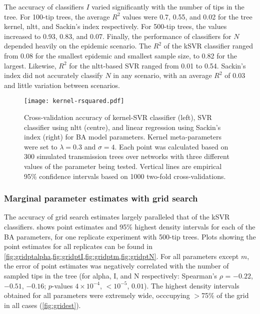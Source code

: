The accuracy of classifiers $I$ varied significantly with the number of tips in
the tree. For 100-tip trees, the average $R^2$ values were
  0.7,
  0.55, and
  0.02
for the tree kernel, \gls{nltt}, and Sackin's index respectively. For 500-tip
trees, the values increased to
  0.93,
  0.83, and
  0.07.
Finally, the performance of classifiers for $N$ depended heavily on the
epidemic scenario. The $R^2$ of the \gls{kSVR} classifier ranged from
  0.08
for the smallest epidemic and smallest sample size, to
  0.82
for the largest. Likewise, $R^2$ for the \gls{nltt}-based SVR ranged from 
  0.01
to
  0.54.
Sackin's index did not accurately classify $N$ in any scenario, with an average
$R^2$ of
  0.03
and little variation between scenarios.

\begin{figure}[ht]
  \centering
  \texttt{[image: kernel-rsquared.pdf]}
  \caption[Cross-validation accuracy of kernel-SVR, nLTT-based SVR, and
  Sackin's index regression classifiers for BA model parameters.]{
      Cross-validation accuracy of kernel-SVR classifier (left), SVR classifier
      using \gls{nltt} (centre), and linear regression using Sackin's index
      (right) for \gls{BA} model parameters. Kernel meta-parameters were set to
      $\lambda = 0.3$ and $\sigma = 4$. Each point was calculated based on 300
      simulated transmission trees over networks with three different values of
      the parameter being tested. Vertical lines are empirical 95\% confidence
      intervals based on 1000 two-fold cross-validations.
  }
  \label{fig:rsquared}
\end{figure}

\subsubsection*{Marginal parameter estimates with grid search}



The accuracy of grid search estimates largely paralleled that of the \gls{kSVR}
classifiers.  shows point estimates and 95\% highest density
intervals for each of the \gls{BA} parameters, for one replicate experiment
with 500-tip trees. Plots showing the point estimates for all replicates can be
found in \cref{fig:gridptalpha,fig:gridptI,fig:gridptm,fig:gridptN}. For all
parameters except $m$, the error of point estimates was negatively correlated
with the number of sampled tips in the tree (for
\gls{alpha}, \gls{I}, and \gls{N} respectively: Spearman's $\rho$ = 
    \ensuremath{-0.22},
    \ensuremath{-0.51},
    \ensuremath{-0.16};
$p$-values
    $4\!\times\!10^{-4}$,
    ${<}10^{-5}$,
    $0.01$).
The highest density intervals obtained for all parameters were extremely wide,
occcupying $>$75\% of the grid in all cases (\cref{fig:gridest}).

